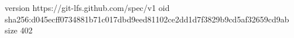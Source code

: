 version https://git-lfs.github.com/spec/v1
oid sha256:d045ecff0734881b71c017dbd9eed81102ce2dd1d7f3829b9cd5af32659cd9ab
size 402
